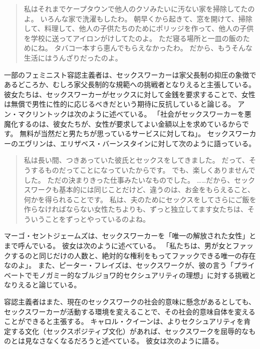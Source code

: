 \documentclass[paper=a4,book,openany]{jlreq} \usepackage{mystyle}
\begin{document}
\begin{quote}
私はそれまでケープタウンで他人のクソみたいに汚ない家を掃除してたのよ。
いろんな家で洗濯もしたわ。
朝早くから起きて、窓を開けて、掃除して、料理して、他人の子供たちのためにポリッジを作って、他人の子供を学校に送ってアイロンがけしてたのよ。
ただ寝る場所と一皿の飯のためにね。
タバコ一本すら恵んでもらえなかったわ。
だから、もうそんな生活にはうんざりだったのよ。
\citep[p.49]{mac18:_revol_prost}
\end{quote}

一部のフェミニスト容認主義者は、セックスワーカーは家父長制の抑圧の象徴であるどころか、むしろ家父長制的な規範への挑戦者となりえると主張している。
彼女たちは、セックスワーカーがセックスに対して金銭を要求することで、女性は無償で男性に性的に応じるべきだという期待に反抗していると論じる。
アン・マクリントックは次のように述べている。
「社会がセックスワーカーを悪魔化するのは、彼女たちが、女性が要求してよい金額以上を求めているからです。
無料が当然だと男たちが思っているサービスに対してね」\citep[p.1]{mcclintock93:_sex_worker_sex_work}。
セックスワーカーのエヴリンは、エリザベス・バーンスタインに対して次のように語っている。

\begin{quote}
私は長い間、つきあっていた彼氏とセックスをしてきました。
だって、そうするものだってことになっていたからです。
でも、楽しくありませんでした。
ただの決まりきった仕事みたいなものでした。
……だから、セックスワークも基本的には同じことだけど、違うのは、お金をもらえること、何かを得られることです。
私は、夫のためにセックスをしてさらにご飯を作らなければならない女性たちよりも、ずっと独立してます{\DDASH}女たちは、そういうことをずっとやっているのよね。
\citep[p.106]{bernstein99:_whats_wrong_prost}
\end{quote}

マーゴ・セントジェームズは、セックスワーカーを「唯一の解放された女性」とまで呼んでいる。
彼女は次のように述べている。
「私たちは、男が女とファックするのと同じだけの人数と、絶対的な権利をもってファックできる唯一の存在なのよ」\citep[p.84]{james87:_reclam_whores}。
また、ピーター・フレイズは、セックスワークが、彼の言う「プライベートでモノガミー的なブルジョワ的セクシュアリティの理想」に対する挑戦となりえると論じている\citep{frase12:_probl_sex_work}。

容認主義者はまた、現在のセックスワークの社会的意味に懸念があるとしても、セックスワーカーが活動する環境を変えることで、その社会的意味自体を変えることができると主張する。
キャロル・クイーンは、よりセクシュアリティを肯定する文化（セックスポジティブ文化）があれば、セックスワークを屈辱的なものとは見なさなくなるだろうと述べている。
彼女は次のように語る。
\end{document}
